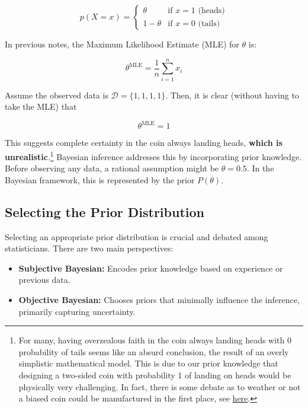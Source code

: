 \[
    p(X=x) =
    \begin{cases}
        \theta     & \text{if } x = 1 \text{ (heads)} \\
        1 - \theta & \text{if } x = 0 \text{ (tails)}
    \end{cases}
\]

In previous notes, the Maximum Likelihood Estimate (MLE) for \( \theta \) is:

\[
    \theta^{\mathrm{MLE}} = \frac{1}{n} \sum_{i=1}^{n} x_i
\]

Assume the observed data is \( \mathcal{D} = \{1, 1, 1, 1\} \). Then, it is clear (without having to take the MLE) that

\begin{equation}
    \theta^{\mathrm{MLE}} = 1 \label{eq:mle_coin_overfit}
\end{equation}

This suggests complete certainty in the coin always landing heads, \textbf{which is unrealistic}.\footnote{For many, having overzealous faith in the coin always landing heads with 0 probability of tails seems like an absurd conclusion, the result of an overly simplistic mathematical model. This is due to our prior knowledge that designing a two-sided coin with probability 1 of landing on heads would be physically very challenging. In fact, there is some debate as to weather or not a biased coin could be manufactured in the first place, see \href{https://www.stat.berkeley.edu/ nolan/Papers/dice.pdf}{here}.} Bayesian inference addresses this by incorporating prior knowledge. Before observing any data, a rational assumption might be \( \theta = 0.5 \). In the Bayesian framework, this is represented by the prior \( P(\theta) \).

\subsection{Selecting the Prior Distribution}

Selecting an appropriate prior distribution is crucial and debated among statisticians. There are two main perspectives:

\begin{itemize}
    \item \textbf{Subjective Bayesian:} Encodes prior knowledge based on experience or previous data.
    \item \textbf{Objective Bayesian:} Chooses priors that minimally influence the inference, primarily capturing uncertainty.
\end{itemize}

